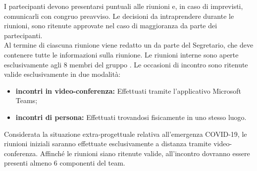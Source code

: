 			I partecipanti devono presentarsi puntuali alle riunioni e, in caso di imprevisti, comunicarli con congruo preavviso.
			Le decisioni da intraprendere durante le riunioni, sono ritenute approvate nel caso di maggioranza da parte dei partecipanti.\\
			Al termine di ciascuna riunione viene redatto un \Verbale{} da parte del Segretario, che deve contenere tutte le informazioni sulla riunione.
				Le riunioni interne sono aperte esclusivamente agli 8 membri del gruppo \Gruppo{}. Le occasioni di incontro sono ritenute valide esclusivamente in due modalità:
				\begin{itemize}
					\item \textbf{incontri in video-conferenza:} Effettuati tramite l'applicativo Microsoft Teams;
					\item \textbf{incontri di persona:} Effettuati trovandosi fisicamente in uno stesso luogo.
				\end{itemize}
				Considerata la situazione extra-progettuale relativa all'emergenza COVID-19, le riunioni iniziali saranno effettuate esclusivamente a distanza tramite video-conferenza.
				Affinché le riunioni siano ritenute valide, all'incontro dovranno essere presenti almeno 6 componenti del team.

